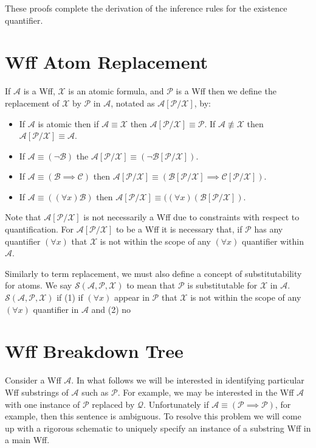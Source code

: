 \documentclass[12pt]{article}
\newcommand{\mc}[1]{\mathcal{#1}}
\begin{document}
These proofs complete the derivation of the inference rules for the existence quantifier.

\section{Wff Atom Replacement}

If $\mc{A}$ is a Wff, $\mc{X}$ is an atomic formula, and $\mc{P}$ is a Wff then we define the replacement of $\mc{X}$ by $\mc{P}$ in $\mc{A}$, notated as $\mc{A}[\mc{P}/\mc{X}]$, by:

\hrulefill
\begin{itemize}
\item{If $\mc{A}$ is atomic then if $\mc{A}\equiv \mc{X}$ then $\mc{A}[\mc{P}/\mc{X}] \equiv \mc{P}$. If $\mc{A}\not\equiv \mc{X}$ then $\mc{A}[\mc{P}/\mc{X}] \equiv \mc{A}$.}
\item{If $\mc{A} \equiv (\lnot \mc{B})$ the $\mc{A}[\mc{P}/\mc{X}] \equiv (\lnot \mc{B}[\mc{P}/\mc{X}])$.}
\item{If $\mc{A} \equiv (\mc{B} \implies \mc{C})$ then $\mc{A}[\mc{P}/\mc{X}] \equiv (\mc{B}[\mc{P}/\mc{X}] \implies \mc{C}[\mc{P}/\mc{X}])$.}
\item{If $\mc{A} \equiv ((\forall x)\mc{B})$ then $\mc{A}[\mc{P}/\mc{X}] \equiv ((\forall x) (\mc{B}[\mc{P}/\mc{X}])$.}
\end{itemize}
\hrulefill

Note that $\mc{A}[\mc{P}/\mc{X}]$ is not necessarily a Wff due to constraints with respect to quantification.
For $\mc{A}[\mc{P}/\mc{X}]$ to be a Wff it is necessary that, if $\mc{P}$ has any quantifier $(\forall x)$ that $\mc{X}$ is not within the scope of any $(\forall x)$ quantifier within $\mc{A}$.

Similarly to term replacement, we must also define a concept of substitutability for atoms. We say $\mc{S}(\mc{A}, \mc{P}, \mc{X})$ to mean that $\mc{P}$ is substitutable for $\mc{X}$ in $\mc{A}$. $\mc{S}(\mc{A}, \mc{P}, \mc{X})$ if (1) if $(\forall x)$ appear in $\mc{P}$ that $\mc{X}$ is not within the scope of any $(\forall x)$ quantifier in $\mc{A}$ and (2) no  

\section{Wff Breakdown Tree}

Consider a Wff $\mc{A}$.
In what follows we will be interested in identifying particular Wff substrings of $\mc{A}$ such as $\mc{P}$.
For example, we may be interested in the Wff $\mc{A}$ with one instance of $\mc{P}$ replaced by $\mc{Q}$.
Unfortunately if $\mc{A} \equiv (\mc{P} \implies \mc{P})$, for example, then this sentence is ambiguous. 
To resolve this problem we will come up with a rigorous schematic to uniquely specify an instance of a substring Wff in a main Wff.
\end{document}
